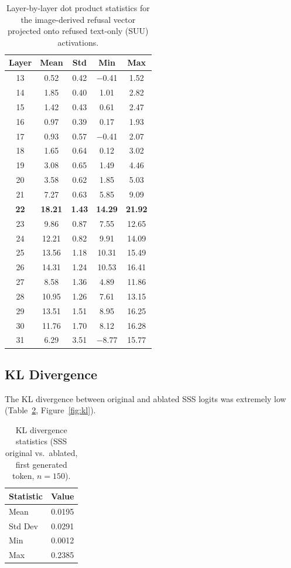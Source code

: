 \documentclass[11pt]{article}
\begin{document}
\begin{table}[H]
\centering
\caption{Layer-by-layer dot product statistics for the image-derived refusal vector projected onto refused text-only (SUU) activations.}
\label{tab:layers}
\small
\begin{tabular}{ccccc}
\toprule
\textbf{Layer} & \textbf{Mean} & \textbf{Std} & \textbf{Min} & \textbf{Max} \\
\midrule
13 & 0.52 & 0.42 & $-$0.41 & 1.52 \\
14 & 1.85 & 0.40 & 1.01 & 2.82 \\
15 & 1.42 & 0.43 & 0.61 & 2.47 \\
16 & 0.97 & 0.39 & 0.17 & 1.93 \\
17 & 0.93 & 0.57 & $-$0.41 & 2.07 \\
18 & 1.65 & 0.64 & 0.12 & 3.02 \\
19 & 3.08 & 0.65 & 1.49 & 4.46 \\
20 & 3.58 & 0.62 & 1.85 & 5.03 \\
21 & 7.27 & 0.63 & 5.85 & 9.09 \\
\textbf{22} & \textbf{18.21} & \textbf{1.43} & \textbf{14.29} & \textbf{21.92} \\
23 & 9.86 & 0.87 & 7.55 & 12.65 \\
24 & 12.21 & 0.82 & 9.91 & 14.09 \\
25 & 13.56 & 1.18 & 10.31 & 15.49 \\
26 & 14.31 & 1.24 & 10.53 & 16.41 \\
27 & 8.58 & 1.36 & 4.89 & 11.86 \\
28 & 10.95 & 1.26 & 7.61 & 13.15 \\
29 & 13.51 & 1.51 & 8.95 & 16.25 \\
30 & 11.76 & 1.70 & 8.12 & 16.28 \\
31 & 6.29 & 3.51 & $-$8.77 & 15.77 \\
\bottomrule
\end{tabular}
\end{table}

\subsection{KL Divergence}

The KL divergence between original and ablated SSS logits was extremely low (Table~\ref{tab:kl}, Figure~\ref{fig:kl}).

\begin{table}[H]
\centering
\caption{KL divergence statistics (SSS original vs.\ ablated, first generated token, $n = 150$).}
\label{tab:kl}
\begin{tabular}{lc}
\toprule
\textbf{Statistic} & \textbf{Value} \\
\midrule
Mean & 0.0195 \\
Std Dev & 0.0291 \\
Min & 0.0012 \\
Max & 0.2385 \\
\bottomrule
\end{tabular}
\end{table}
\end{document}
